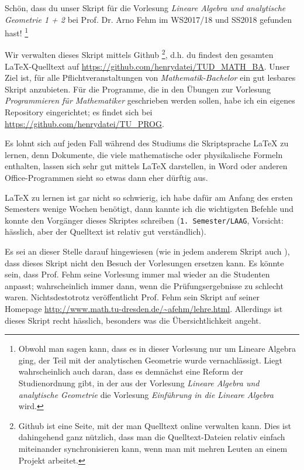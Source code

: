 Schön, dass du unser Skript für die Vorlesung \textit{Lineare Algebra und analytische Geometrie 1 + 2} bei Prof. Dr. Arno Fehm im WS2017/18 und SS2018 gefunden hast! \footnote{Obwohl man sagen kann, dass es in dieser Vorlesung nur um Lineare Algebra ging, der Teil mit der analytischen Geometrie wurde vernachlässigt. Liegt wahrscheinlich auch daran, dass es demnächst eine Reform der Studienordnung gibt, in der aus der Vorlesung \textit{Lineare Algebra und analytische Geometrie} die Vorlesung \textit{Einführung in die Lineare Algebra} wird.}

Wir verwalten dieses Skript mittels Github \footnote{Github ist eine Seite, mit der man Quelltext online verwalten kann. Dies ist dahingehend ganz nützlich, dass man die Quelltext-Dateien relativ einfach miteinander synchronisieren kann, wenn man mit mehren Leuten an einem Projekt arbeitet.}, d.h. du findest den gesamten \LaTeX-Quelltext auf \url{https://github.com/henrydatei/TUD_MATH_BA}. Unser Ziel ist, für alle Pflichtveranstaltungen von \textit{Mathematik-Bachelor} ein gut lesbares Skript anzubieten. Für die Programme, die in den Übungen zur Vorlesung \textit{Programmieren für Mathematiker} geschrieben werden sollen, habe ich ein eigenes Repository eingerichtet; es findet sich bei \url{https://github.com/henrydatei/TU_PROG}.

Es lohnt sich auf jeden Fall während des Studiums die Skriptsprache \LaTeX{} zu lernen, denn Dokumente, die viele mathematische oder physikalische Formeln enthalten, lassen sich sehr gut mittels \LaTeX{} darstellen, in Word oder anderen Office-Programmen sieht so etwas dann eher dürftig aus.

\LaTeX{} zu lernen ist gar nicht so schwierig, ich habe dafür am Anfang des ersten Semesters wenige Wochen benötigt, dann kannte ich die wichtigsten Befehle und konnte den Vorgänger dieses Skriptes schreiben (\texttt{1. Semester/LAAG}, Vorsicht: hässlich, aber der Quelltext ist relativ gut verständlich).

Es sei an dieser Stelle darauf hingewiesen (wie in jedem anderem Skript auch \smiley{}), dass dieses Skript nicht den Besuch der Vorlesungen ersetzen kann. Es könnte sein, dass Prof. Fehm seine Vorlesung immer mal wieder an die Studenten anpasst; wahrscheinlich immer dann, wenn die Prüfungsergebnisse zu schlecht waren. Nichtsdestotrotz veröffentlicht Prof. Fehm sein Skript auf seiner Homepage \url{http://www.math.tu-dresden.de/~afehm/lehre.html}. Allerdings ist dieses Skript recht hässlich, besonders was die Übersichtlichkeit angeht.

